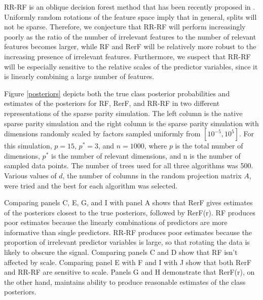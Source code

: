 \documentclass{article}
\begin{document}
RR-RF is an oblique decision forest method that has been recently proposed in \cite{Blaser2016}. Uniformly random rotations of the feature space imply that in general, splits will not be sparse. Therefore, we conjecture that RR-RF will perform increasingly poorly as the ratio of the number of irrelevant features to the number of relevant features becomes larger, while RF and RerF will be relatively more robust to the increasing presence of irrelevant features. Furthermore, we suspect that RR-RF will be especially sensitive to the relative scales of the predictor variables, since it is linearly combining a large number of features.

Figure \ref{posteriors} depicts both the true class posterior probabilities and estimates of the posteriors for RF, RerF, and RR-RF in two different representations of the sparse parity simulation. The left column is the native sparse parity simulation and the right column is the sparse parity simulation with dimensions randomly scaled by factors sampled uniformly from $[10^{-5},10^5]$. For this simulation, $p = 15$, $p^* = 3$, and $n = 1000$, where $p$ is the total number of dimensions, $p^*$ is the number of relevant dimensions, and n is the number of sampled data points. The number of trees used for all three algorithms was 500. Various values of $d$, the number of columns in the random projection matrix $A$, were tried and the best for each algorithm was selected. 

Comparing panels C, E, G, and I with panel A shows that RerF gives estimates of the posteriors closest to the true posteriors, followed by RerF(r). RF produces poor estimates because the linearly combinations of predictors are more informative than single predictors. RR-RF produces poor estimates because the proportion of irrelevant predictor variables is large, so that rotating the data is likely to obscure the signal. Comparing panels C and D show that RF isn't affected by scale. Comparing panel E with F and I with J show that both RerF and RR-RF are sensitive to scale. Panels G and H demonstrate that RerF(r), on the other hand, maintains ability to produce reasonable estimates of the class posteriors.
\end{document}
